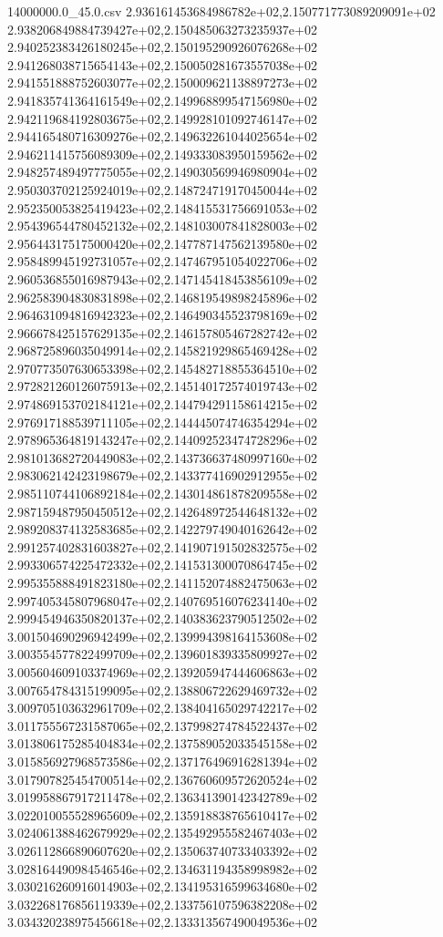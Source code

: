 \begin{filecontents*}{14000000.0_45.0.csv}
2.936161453684986782e+02,2.150771773089209091e+02
2.938206849884739427e+02,2.150485063273235937e+02
2.940252383426180245e+02,2.150195290926076268e+02
2.941268038715654143e+02,2.150050281673557038e+02
2.941551888752603077e+02,2.150009621138897273e+02
2.941835741364161549e+02,2.149968899547156980e+02
2.942119684192803675e+02,2.149928101092746147e+02
2.944165480716309276e+02,2.149632261044025654e+02
2.946211415756089309e+02,2.149333083950159562e+02
2.948257489497775055e+02,2.149030569946980904e+02
2.950303702125924019e+02,2.148724719170450044e+02
2.952350053825419423e+02,2.148415531756691053e+02
2.954396544780452132e+02,2.148103007841828003e+02
2.956443175175000420e+02,2.147787147562139580e+02
2.958489945192731057e+02,2.147467951054022706e+02
2.960536855016987943e+02,2.147145418453856109e+02
2.962583904830831898e+02,2.146819549898245896e+02
2.964631094816942323e+02,2.146490345523798169e+02
2.966678425157629135e+02,2.146157805467282742e+02
2.968725896035049914e+02,2.145821929865469428e+02
2.970773507630653398e+02,2.145482718855364510e+02
2.972821260126075913e+02,2.145140172574019743e+02
2.974869153702184121e+02,2.144794291158614215e+02
2.976917188539711105e+02,2.144445074746354294e+02
2.978965364819143247e+02,2.144092523474728296e+02
2.981013682720449083e+02,2.143736637480997160e+02
2.983062142423198679e+02,2.143377416902912955e+02
2.985110744106892184e+02,2.143014861878209558e+02
2.987159487950450512e+02,2.142648972544648132e+02
2.989208374132583685e+02,2.142279749040162642e+02
2.991257402831603827e+02,2.141907191502832575e+02
2.993306574225472332e+02,2.141531300070864745e+02
2.995355888491823180e+02,2.141152074882475063e+02
2.997405345807968047e+02,2.140769516076234140e+02
2.999454946350820137e+02,2.140383623790512502e+02
3.001504690296942499e+02,2.139994398164153608e+02
3.003554577822499709e+02,2.139601839335809927e+02
3.005604609103374969e+02,2.139205947444606863e+02
3.007654784315199095e+02,2.138806722629469732e+02
3.009705103632961709e+02,2.138404165029742217e+02
3.011755567231587065e+02,2.137998274784522437e+02
3.013806175285404834e+02,2.137589052033545158e+02
3.015856927968573586e+02,2.137176496916281394e+02
3.017907825454700514e+02,2.136760609572620524e+02
3.019958867917211478e+02,2.136341390142342789e+02
3.022010055528965609e+02,2.135918838765610417e+02
3.024061388462679929e+02,2.135492955582467403e+02
3.026112866890607620e+02,2.135063740733403392e+02
3.028164490984546546e+02,2.134631194358998982e+02
3.030216260916014903e+02,2.134195316599634680e+02
3.032268176856119339e+02,2.133756107596382208e+02
3.034320238975456618e+02,2.133313567490049536e+02

\end{filecontents*}

